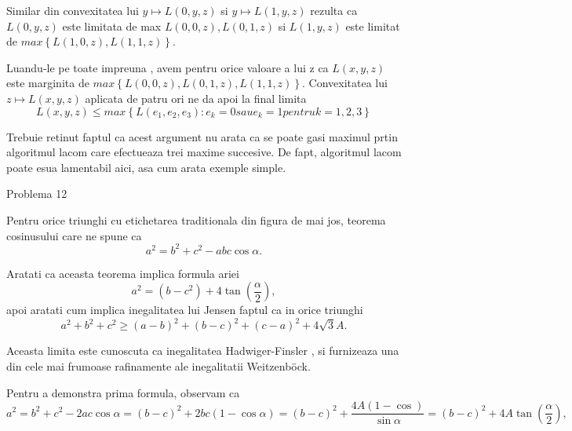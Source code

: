 \documentclass[a4paper,12pt,oneside]{report}
\begin{document}
 Similar din convexitatea lui \(y \mapsto L\left ( 0,y,z \right )\) si \(y \mapsto L\left ( 1,y,z \right )\)  rezulta ca \(L\left ( 0, y, z \right )\) este limitata de max  \(L\left ( 0,0,z \right ), L\left ( 0,1,z \right )\) si \( L\left ( 1,y,z \right )\) este limitat de \(max \left \{ L\left ( 1,0,z \right ) , L \left ( 1,1,z \right )\right \}\). 
 
 Luandu-le pe toate impreuna , avem pentru orice valoare a lui z ca \(L\left ( x,y,z \right )\) este marginita de \(max\left \{ L\left ( 0,0,z \right ), L\left ( 0,1,z \right ), L\left ( 1,1,z \right ) \right \}\). Convexitatea lui \(z \mapsto L\left ( x,y,z \right )\) aplicata de patru ori ne da apoi la final limita 
 \begin{displaymath}
  L\left ( x,y,z \right ) \leq  max \left \{ L\left ( e_{1} , e_{2}, e_{3}\right ): e_{k}  = 0 sau e_{k} = 1 pentru k = 1,2,3\right \}
\end{displaymath}
  
Trebuie retinut faptul  ca acest argument nu arata ca se poate gasi maximul prtin algoritmul lacom care efectueaza trei maxime succesive. De fapt, algoritmul lacom poate esua lamentabil aici, asa cum arata exemple simple. 

Problema 12

Pentru orice triunghi cu etichetarea traditionala din figura de mai jos, teorema cosinusului care ne spune ca 
\begin{displaymath}
  a^{2} = b^{2}+ c^{2} - abc\cos\alpha.
\end{displaymath}

Aratati ca aceasta teorema implica formula ariei 
\begin{displaymath}
  a^{2} = \left ( b - c^{2} \right ) + 4\tan \left ( \frac{\alpha }{2} \right ), 
\end{displaymath}
apoi aratati cum implica inegalitatea lui Jensen faptul ca in orice triunghi 
\begin{displaymath}
  a^{2} + b^{2} + c^{2} \geq  \left ( a - b  \right )^{2} + \left ( b- c  \right )^{2} + \left ( c - a \right )^{2} + 4\sqrt{3}A. 
\end{displaymath}

Aceasta limita este cunoscuta ca inegalitatea Hadwiger-Finsler , si furnizeaza una din cele mai frumoase rafinamente ale inegalitatii Weitzenböck. 

Pentru a demonstra prima formula, observam ca 
\begin{displaymath}
  a^{2} = b^{2} + c^{2} - 2ac\cos\alpha  = \left (  b - c \right )^{2} + 2bc\left ( 1 - \cos\alpha  \right ) = \left ( b - c \right )^{2} + \frac{4A\left ( 1 - \cos  \right )}{\sin \alpha } = \left ( b - c \right )^{2} + 4A\tan\left ( \frac{\alpha }{2} \right ),
\end{displaymath}
\end{document}
